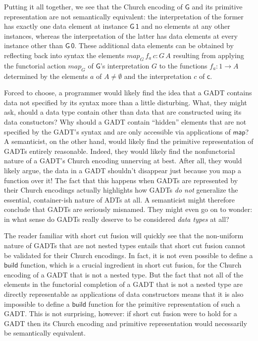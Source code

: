 \documentclass[acmsmall,screen,review,anonymous]{acmart}
\theoremstyle{definition}
\begin{document}
\begin{example}
Putting it all together, we see that the Church encoding of
$\mathsf{G}$ and its primitive representation are not semantically
equivalent: the interpretation of the former has exactly one data
element at instance $\mathsf{G\,1}$ and no elements at any other
instances, whereas the interpretation of the latter has data elements
at every instance other than $\mathsf{G\,0}$.
These additional data elements can be obtained by reflecting back into
syntax the elements $\mathit{map}_G\,f_a\,c : G\,A$ resulting from
applying the functorial action $\mathit{map}_G$ of $\mathsf{G}$'s
interpretation $G$ to the functions $f_a : 1 \to A$ determined by the
elements $a$ of $A \not = \emptyset$ and the interpretation $c$ of
$\mathsf{c}$.
\end{example}

Forced to choose, a programmer would likely find the idea that a GADT
contains data not specified by its syntax more than a little
disturbing. What, they might ask, should a data type contain other
than data that are constructed using its data constuctors? Why should
a GADT contain ``hidden'' elements that are not specified by the
GADT's syntax and are only accessible via applications of
$\mathsf{map}$? A semanticist, on the other hand, would likely find
the primitive representation of GADTs entirely reasonable. Indeed,
they would likely find the nonfunctorial nature of a GADT's Church
encoding unnerving at best. After all, they would likely argue, the
data in a GADT shouldn't disappear just because you map a function
over it! The fact that this happens when GADTs are represented by
their Church encodings actually highlights how GADTs {\em do not}
generalize the essential, container-ish nature of ADTs at all. A
semanticist might therefore conclude that GADTs are seriously
misnamed. They might even go on to wonder: in what sense do GADTs
really deserve to be considered {\em data types} at all?

The reader familiar with short cut fusion will quickly see that the
non-uniform nature of GADTs that are not nested types entails that
short cut fusion cannot be validated for their Church encodings. In
fact, it is not even possible to define a $\mathsf{build}$ function,
which is a crucial ingredient in short cut fusion, for the Church
encoding of a GADT that is not a nested type. But the fact that not
all of the elements in the functorial completion of a GADT that is not
a nested type are directly representable as applications of data
constructors means that it is also impossible to define a
$\mathsf{build}$ function for the primitive representation of such a
GADT.  This is not surprising, however: if short cut fusion were to
hold for a GADT then its Church encoding and primitive representation
would necessarily be semantically equivalent.
\end{document}
